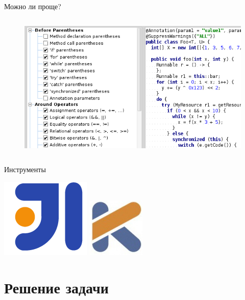 \documentclass[sans]{beamer}
\begin{document}
\begin{frame}{Можно ли проще?}
\begin{columns}
		\begin{column}{.4\textwidth}
			\begin{figure}
				\includegraphics[width = \linewidth]{images/snapshot1.png}
			\end{figure}
		\end{column}
	\end{columns}
\end{frame}

\begin{frame}{Инструменты}
	\begin{center}
		\includegraphics[width = 0.3\linewidth]{images/idea-logo.png}
		\hspace{3cm}
		\includegraphics[width = 0.3\linewidth]{images/kotlin-logo.jpg}
	\end{center}
\end{frame}

\section{Решение задачи}
\end{document}

